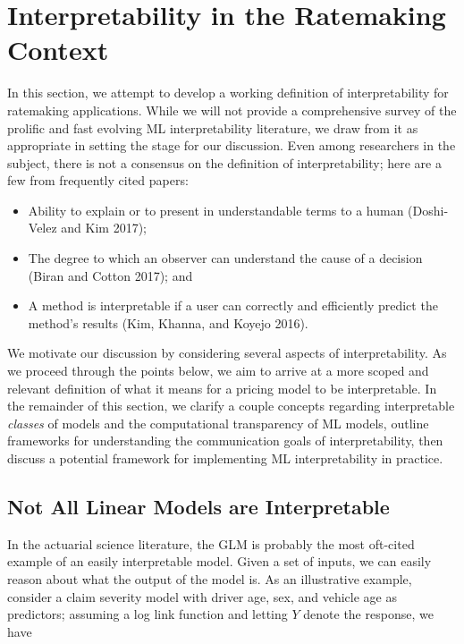 \documentclass[preprint, 3p, twocolumn, letterpaper, 10pt]{elsarticle} %
\providecommand{\tightlist}{%
  \setlength{\itemsep}{0pt}\setlength{\parskip}{0pt}}
\begin{document}
\hypertarget{interpretability}{%
\section{Interpretability in the Ratemaking Context}\label{interpretability}}

In this section, we attempt to develop a working definition of interpretability
for ratemaking applications. While we will not provide a comprehensive survey of
the prolific and fast evolving ML interpretability literature, we draw from it
as appropriate in setting the stage for our discussion. Even among researchers
in the subject, there is not a consensus on the definition of interpretability;
here are a few from frequently cited papers:

\begin{itemize}
\tightlist
\item
  Ability to explain or to present in understandable terms to a human
  (Doshi-Velez and Kim 2017);
\item
  The degree to which an observer can understand the cause of a decision
  (Biran and Cotton 2017); and
\item
  A method is interpretable if a user can correctly and efficiently predict the
  method's results (Kim, Khanna, and Koyejo 2016).
\end{itemize}

We motivate our discussion by considering several aspects of interpretability.
As we proceed through the points below, we aim to arrive at a more scoped and
relevant definition of what it means for a pricing
model to be interpretable. In the remainder of this section, we clarify a couple concepts regarding
interpretable \emph{classes} of models and the computational transparency of ML
models, outline frameworks for understanding the communication goals of interpretability,
then discuss a potential framework for implementing ML
interpretability in practice.

\hypertarget{linear-models}{%
\subsection{Not All Linear Models are Interpretable}\label{linear-models}}

In the actuarial science literature, the GLM is probably the most oft-cited
example of an easily interpretable model. Given a set of inputs, we can easily
reason about what the output of the model is. As an illustrative example,
consider a claim severity model with driver age, sex, and vehicle age as
predictors; assuming a log link function and letting \(Y\) denote the response, we
have
\end{document}
